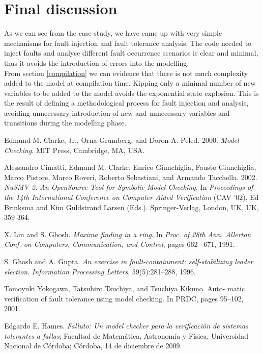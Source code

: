 \documentclass[12pt]{article}
\begin{document}
\section{Final discussion}
As we can see from the case study, we have came up with very simple mechanisms for fault injection and fault tolerance analysis. The code needed to inject faults and analyse different fault occurrence scenarios is clear and minimal, thus it avoids the introduction of errors into the modelling.\\
From section \ref{compilation} we can evidence that there is not much complexity added to the model at compilation time. Kipping only a minimal number of new variables to be added to the model avoids the exponential state explosion. This is the result of defining a methodological process for fault injection and analysis, avoiding unnecessary introduction of new and unnecessary variables and transitions during the modelling phase.\\



%
%
\begin{thebibliography}{9}

    Edmund M. Clarke, Jr., Orna Grumberg, and Doron A. Peled. 2000.
    \emph{Model Checking}. MIT Press, Cambridge, MA, USA. 

    Alessandro Cimatti, Edmund M. Clarke, Enrico Giunchiglia, Fausto
    Giunchiglia, Marco Pistore, Marco Roveri, Roberto Sebastiani, and Armando
    Tacchella. 2002. \emph{NuSMV 2: An OpenSource Tool for Symbolic Model
    Checking.} In \emph{Proceedings of the 14th International Conference on
    Computer Aided Verification} (CAV '02), Ed Brinksma and Kim Guldstrand
    Larsen (Eds.). Springer-Verlag, London, UK, UK, 359-364. 

    X. Lin and S. Ghosh. \emph{Maxima finding in a ring}. In \emph{Proc. of 28th Ann.
    Allerton Conf. on Computers, Communication, and Control}, pages 662–
    671, 1991.

    S. Ghosh and A. Gupta. \emph{An exercise in fault-containment: self-stabilizing
    leader election}. \emph{Information Processing Letters}, 59(5):281–288, 1996.

    Tomoyuki Yokogawa, Tatsuhiro Tsuchiya, and Tsuchiya Kikuno. Auto-
    matic verification of fault tolerance using model checking. In PRDC,
    pages 95–102, 2001.
    
    Edgardo E. Hames. \emph{Falluto: Un model checker para la verificaci\'on de sistemas tolerantes a fallas}; Facultad de Matem\'atica, Astronom\'ia y F\'isica, Universidad Nacional de C\'ordoba; C\'ordoba, 14 de diciembre de 2009.

\end{thebibliography}
\end{document}
